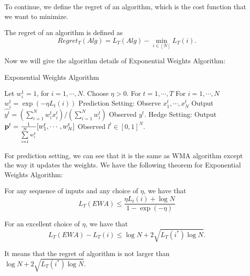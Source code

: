 \documentclass[../main.tex]{subfiles}
\begin{document}
To continue, we define the regret of an algorithm, which is the cost function that we want to minimize.

\begin{definition}
	The regret of an algorithm is defined as
	\begin{equation}
	Regret_T(Alg) = L_T(Alg) - \min\limits_{i\in [N]} L_T(i).
	\end{equation}
\end{definition}

Now we will give the algorithm details of Exponential Weights Algorithm:

\begin{algorithm}[H]
	\caption{Exponential Weights Algorithm}
	\begin{algorithmic}
		\STATE Let $w_i^1 = 1$, for $i = 1, \cdots, N$. Choose $\eta > 0$.
		\STATE For $t = 1,\cdots, T$
		\bindent
		\STATE For $i = 1,\cdots , N$
		\bindentt
		\STATE $w_i^t = \exp(-\eta L_t(i))$
		\eindentt
		\STATE Prediction Setting:
		\bindentt
		\STATE Observe $x_1^t, \cdots ,x_N^t$
		\STATE Output $\hat{y^t} = (\sum\limits_{i=1}^N w_i^t x_i^t) / (\sum\limits_{i=1}^N w_i^t)$
		\STATE Observed $y^t$.
		\eindentt
		\STATE Hedge Setting:
		\bindentt
		\STATE Output $\mathbf{p}^t = \frac{1}{\sum\limits_{i=1}^N w_i^t} [w_1^t, \cdots, w_N^t]$
		\STATE Observed $l^t \in [0,1]^N$.
		\eindentt
		\eindent
	\end{algorithmic}
\end{algorithm}

For prediction setting, we can see that it is the same as WMA algorithm except the way it updates the weights. We have the following theorem for Exponential Weights Algorithm:

\begin{theorem}\label{ewa_theorem}
	For any sequence of inputs and any choice of $\eta$, we have that 
	\begin{equation}
	L_T(EWA) \leq \frac{\eta L_t(i) + \log N}{1 - \exp(-\eta)}
	\end{equation}
\end{theorem}

\begin{corollary}\label{ewa_corollary}
	For an excellent choice of $\eta$, we have that 
	\begin{equation}
	L_T(EWA) - L_T(i) \leq \log N + 2 \sqrt{L_T(i^*) \log N}.
	\end{equation}
	
	It means that the regret of algorithm is not larger than $\log N + 2 \sqrt{L_T(i^*) \log N}$.
\end{corollary}
\end{document}
